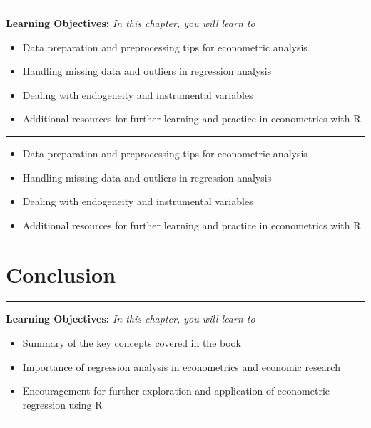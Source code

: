 \documentclass[
  letterpaper,
  twoside,
  openany]{scrbook}
\providecommand{\abstractname}{Learning Objectives} %
\newenvironment{objectives}[1]{%
	\hrule
	\vspace{5pt}
	\small\textbf{\abstractname: } 
	\newline
	\vspace{0.1cm}
	\small\emph{#1} %
	\itshape %
}{%
	\vspace{5pt}
	\hrule
	\vspace{0.6cm}
}
\begin{document}
\begin{objectives}{In this chapter, you will learn to}
\begin{itemize}

\item{Data preparation and preprocessing tips for econometric analysis}

\item{Handling missing data and outliers in regression analysis}

\item{Dealing with endogeneity and instrumental variables}

\item{Additional resources for further learning and practice in econometrics with R}

\end{itemize}

\end{objectives}

\begin{itemize}
\item
  Data preparation and preprocessing tips for econometric analysis
\item
  Handling missing data and outliers in regression analysis
\item
  Dealing with endogeneity and instrumental variables
\item
  Additional resources for further learning and practice in econometrics
  with R
\end{itemize}

\hypertarget{conclusion}{%
\chapter{Conclusion}\label{conclusion}}

\begin{objectives}{In this chapter, you will learn to}
\begin{itemize}

\item{Summary of the key concepts covered in the book}

\item{Importance of regression analysis in econometrics and economic research}

\item{Encouragement for further exploration and application of econometric regression using R}

\end{itemize}

\end{objectives}
\end{document}
